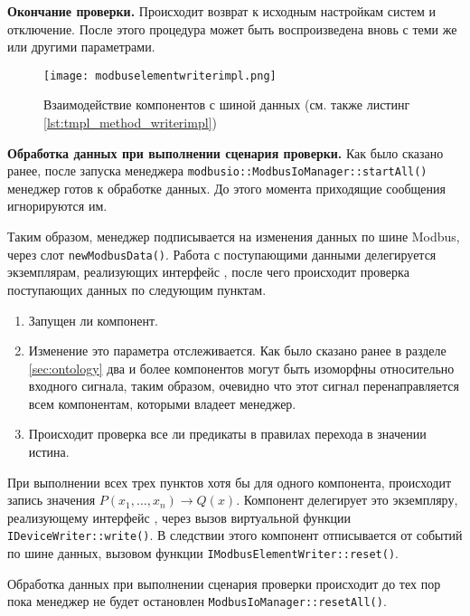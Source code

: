 \textbf{Окончание проверки.}
Происходит возврат к исходным настройкам систем и отключение.
После этого процедура может быть воспроизведена вновь с теми же
или другими параметрами. 

\begin{center}
    \begin{figure}
        \texttt{[image: modbuselementwriterimpl.png]}
        \caption[Взаимодействие компонентов с шиной данных]
            {Взаимодействие компонентов с шиной данных (см. также листинг \ref{lst:tmpl_method_writerimpl})}
        \label{fig:modbuselementwriterimpl}
    \end{figure}
\end{center}


\textbf{Обработка данных при выполнении сценария проверки.}
Как было сказано ранее, после запуска менеджера \texttt{modbusio::\-ModbusIoManager::\-start\-All()}
менеджер готов к обработке данных.
До этого момента приходящие сообщения игнорируются им.

Таким образом, менеджер подписывается на изменения данных по шине Modbus,
через слот \texttt{newModbusData()}.
Работа с поступающими данными делегируется экземплярам, реализующих интерфейс
\mbwriter, после чего происходит проверка поступающих данных по следующим пунктам.
\begin{enumerate}
    \item Запущен ли компонент.
    \item Изменение это параметра отслеживается. Как было сказано ранее в разделе \ref{sec:ontology}
        два и более компонентов могут быть изоморфны относительно входного сигнала,
        таким образом, очевидно что этот сигнал перенаправляется всем компонентам,
        которыми владеет менеджер.
    \item Происходит проверка все ли предикаты в правилах перехода в значении истина. 
\end{enumerate}
При выполнении всех трех пунктов хотя бы для одного компонента,
происходит запись значения $P(x_1, \ldots, x_n) \to Q(x)$.
Компонент делегирует это экземпляру, реализующему интерфейс \mbdevice,
через вызов виртуальной функции \texttt{IDeviceWriter::write()}.
В следствии этого компонент отписывается от событий по шине данных,
вызовом функции \texttt{IModbusElementWriter::reset()}.

Обработка данных при выполнении сценария проверки происходит до тех пор
пока менеджер не будет остановлен \texttt{ModbusIoManager::resetAll()}.


